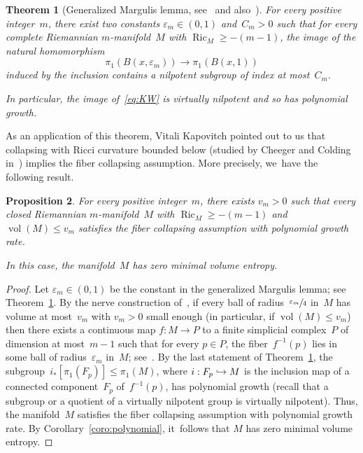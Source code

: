 \documentclass[11pt]{article}
\newcommand\hto{\mathrel{\lhook\joinrel\to}}
\let\oldsfrac\sfrac
\renewcommand{\sfrac}[2]{{\oldsfrac{#1}{#2}}}
\newtheorem{theorem}{Theorem}[section]
\newtheorem{proposition}[theorem]{Proposition}
\theoremstyle{definition}
\DeclareMathOperator{\Ric}{Ric}
\DeclareMathOperator{\vol}{vol}
\numberwithin{equation}{section}
\begin{document}
\begin{theorem}[Generalized Margulis lemma, see~\cite{KW} and also~\cite{courtois}] \label{theo:KW}
For every positive integer~$m$, there exist two constants $\varepsilon_m \in (0,1)$ and~$C_m>0$ such that for every complete Riemannian $m$\nobreakdash-manifold~$M$ with $\Ric_M \geq -(m-1)$, the image of the natural homomorphism
\begin{equation} \label{eq:KW}
\pi_1(B(x,\varepsilon_m)) \to \pi_1(B(x,1))
\end{equation}
induced by the inclusion contains a nilpotent subgroup of index at most~$C_m$.

In particular, the image of~\eqref{eq:KW} is virtually nilpotent and so has polynomial growth.
\end{theorem}

As an application of this theorem, Vitali Kapovitch pointed out to us that collapsing with Ricci curvature bounded below (studied by Cheeger and Colding in~\cite{CC97}) implies the fiber collapsing assumption.
More precisely, we~have the following result.

\begin{proposition} \label{prop:Ricci}
For every positive integer~$m$, there exists $v_m>0$ such that every closed Riemannian $m$\nobreakdash-manifold~$M$ with $\Ric_M \geq -(m-1)$ and $\vol(M) \leq v_m$ satisfies the fiber collapsing assumption with polynomial growth rate.

In this case, the manifold~$M$ has zero minimal volume entropy.
\end{proposition}

\begin{proof}
Let $\varepsilon_m \in (0,1)$ be the constant in the generalized Margulis lemma; see Theorem~\ref{theo:KW}.
By the nerve construction of~\cite[\S3.4]{gro82}, if every ball of radius~$\sfrac{\varepsilon_m}{4}$ in~$M$ has volume at most~$v_m$ with $v_m>0$ small enough (in particular, if $\vol(M) \leq v_m$) then there exists a continuous map $f:M \to P$ to a finite simplicial complex~$P$ of dimension at most~$m-1$ such that for every $p \in P$, the fiber~$f^{-1}(p)$ lies in some ball of radius~$\varepsilon_m$ in~$M$; see~\cite[Cor., p.\,52]{gro82}.
By the last statement of Theorem~\ref{theo:KW}, the subgroup~$i_*[\pi_1(F_p)] \leqslant \pi_1(M)$, where $i:F_p \hto M$ is the inclusion map of a connected component~$F_p$ of~$f^{-1}(p)$, has polynomial growth (recall that a subgroup or a quotient of a virtually nilpotent group is virtually nilpotent).
Thus, the manifold~$M$ satisfies the fiber collapsing assumption with polynomial growth rate.
By Corollary~\ref{coro:polynomial}, it~follows that $M$ has zero minimal volume entropy.
\end{proof}
\end{document}
